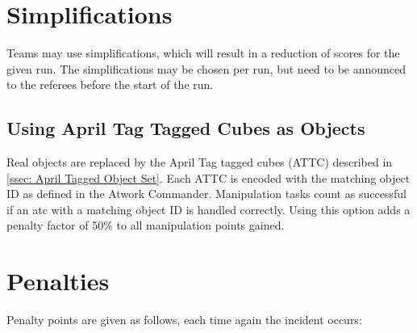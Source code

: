 \section{Simplifications}
Teams may use simplifications, which will result in a reduction of scores for the given run. The simplifications may be chosen per run, but need to be announced to the referees before the start of the run.


\subsection{Using April Tag Tagged Cubes as Objects}
Real objects are replaced by the April Tag tagged cubes (ATTC)  described in \ref{ssec: April Tagged Object Set}.
Each ATTC is encoded with the matching object ID as defined in the Atwork Commander.
Manipulation tasks count as successful if an atc with a matching object ID is handled correctly. Using this option adds a penalty factor of 50\% to all manipulation points gained.




\section{Penalties}
\label{sec:penalties}
Penalty points are given as follows, each time again the incident occurs:

